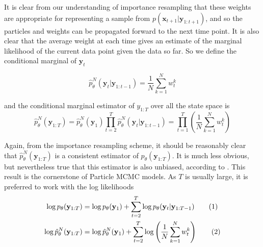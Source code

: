 \documentclass[11pt,a4,twosided,singlespacing,titlepagenumber=on]{scrreprt}
\numberwithin{equation}{chapter} %
\theoremstyle{remark}
\newcommand{\matr}[1]{\mathbf{#1}}
\newcommand\numberthis{\addtocounter{equation}{1}\tag{\theequation}}
\begin{document}
It is clear from our understanding of importance resampling that these weights are appropriate for representing a sample from $p(\matr{x}_{t+1}|\matr{y}_{1:t+1})$, and so the particles and weights can be propagated forward to the next time point. It is also clear that the average weight at each time gives an estimate of the marginal likelihood of the current data point given the data so far. So we define the conditional marginal of $\matr{y}_t$

\begin{equation}
 \hat{p}^N_{\theta}(\matr{y}_t | \matr{y}_{1:t-1}) = \frac{1}{N} \sum_{k=1}^N w_t^k
\end{equation}

and the conditional marginal estimator of $y_{1:T}$ over all the state space is
\begin{equation}
 \hat{p}^N_\theta(\matr{y}_{1:T}) = \hat{p}^N_\theta(\matr{y}_1)\prod_{t=2}^T \hat{p}^N_\theta(\matr{y}_t | \matr{y}_{1:t-1}) = \prod_{t=1}^T \left( \frac{1}{N} \sum_{k=1}^N w_t^k \right)
\end{equation}

Again, from the importance resampling scheme, it should be reasonably clear that $\hat{p}^N_{\theta}(\matr{y}_{1:T})$ is a consistent estimator of $p_{\theta}(\matr{y}_{1:T})$. It is much less obvious, but nevertheless true that this estimator is also unbiased, according to \cite{delmoral2004}. This result is the cornerstone of Particle MCMC models. As $T$ is usually large, it is preferred to work with the log likelihoods
\begin{align*}
\log p_{\theta}(\matr{y}_{1:T}) &= \log p_\theta(\matr{y}_1) + \sum_{t=2}^T \log p_\theta(\matr{y}_t | \matr{y}_{1:T-1}) \numberthis \\
\log \hat{p}^N_\theta(\matr{y}_{1:T}) &= \log \hat{p}^N_\theta(\matr{y}_1) + \sum_{t=2}^T \log \left(\frac{1}{N} \sum_{k=1}^N w_t^{k} \right) \numberthis
\end{align*}
\end{document}
